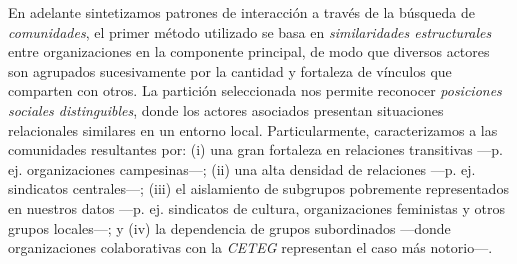 \documentclass[letterpaper, 11pt]{book}
\theoremstyle{definition}
\theoremstyle{remark}
\begin{document}
En adelante sintetizamos patrones de interacción a través de la búsqueda de \emph{comunidades}, el primer método utilizado se basa en \emph{similaridades estructurales} entre organizaciones en la componente principal, de modo que diversos actores son agrupados sucesivamente por la cantidad y fortaleza de vínculos que comparten con otros. 
La partición seleccionada nos permite reconocer \emph{posiciones sociales distinguibles}, donde los actores asociados presentan situaciones relacionales similares en un entorno local. 
Particularmente, caracterizamos a las comunidades resultantes por: 
(i) una gran fortaleza en relaciones transitivas ---p. ej. organizaciones campesinas---; 
(ii) una alta densidad de relaciones ---p. ej. sindicatos centrales---; 
(iii) el aislamiento de subgrupos pobremente representados en nuestros datos ---p. ej. sindicatos de cultura, organizaciones feministas y otros grupos locales---; 
y (iv) la dependencia de grupos subordinados ---donde organizaciones colaborativas con la \emph{CETEG} representan el caso más notorio---. 


\end{document}
